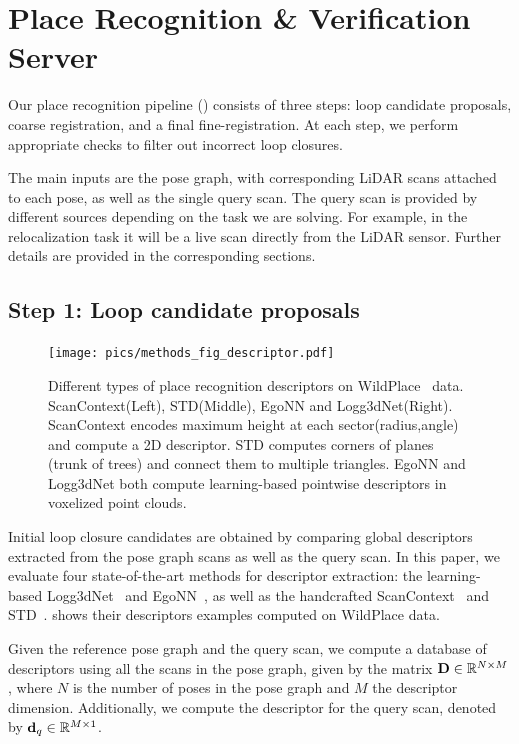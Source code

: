 \section{Place Recognition \& Verification Server} \label{sec:pipeline}
Our place recognition pipeline () consists of three steps: loop candidate proposals, coarse registration, and a final fine-registration. At each step, we perform appropriate checks to filter out incorrect loop closures.

The main inputs are the pose graph, with corresponding LiDAR scans attached to each pose, as well as the single query scan. The query scan is provided by different sources depending on the task we are solving. For example, in the relocalization task it will be a live scan directly from the LiDAR sensor. Further details are provided in the corresponding sections.

\subsection*{\textbf{Step 1: Loop candidate proposals}}
\label{subsubsec:loop-candidate}
\begin{figure}[htbp]
  \centering
  \texttt{[image: pics/methods\_fig\_descriptor.pdf]}
  \caption{Different types of place recognition descriptors on WildPlace~\cite{knights2023icra} data. ScanContext(Left), STD(Middle), EgoNN and Logg3dNet(Right). ScanContext encodes maximum height at each sector(radius,angle) and compute a 2D descriptor. STD computes corners of planes (trunk of trees) and connect them to multiple triangles. EgoNN and Logg3dNet both compute learning-based pointwise descriptors in voxelized point clouds.  }
  \label{fig:descriptors_example}
\end{figure}
Initial loop closure candidates are obtained by comparing global descriptors extracted from the pose graph scans as well as the query scan. In this paper, we evaluate four state-of-the-art methods for descriptor extraction: the learning-based Logg3dNet~\cite{vidanapathirana2022icra} and EgoNN~\cite{komorowski2022ral}, as well as the handcrafted ScanContext~\cite{kim2018iros} and STD~\cite{yuan2023icra}.  shows their descriptors examples computed on WildPlace data.  

Given the reference pose graph and the query scan, we compute a database of descriptors using all the scans in the pose graph, given by the matrix $\mathbf{D} \in \mathbb{R}^{N\times M}$, where $N$ is the number of poses in the pose graph and $M$ the descriptor dimension. Additionally, we compute the descriptor for the query scan, denoted by $\mathbf{d}_{q} \in \mathbb{R}^{M \times 1}$. 

